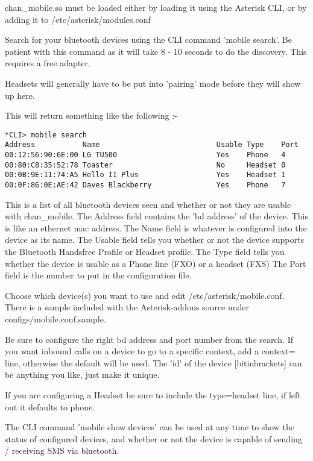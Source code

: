 chan\_mobile.so must be loaded either by loading it using the Asterisk CLI, or by adding it to /etc/asterisk/modules.conf

Search for your bluetooth devices using the CLI command 'mobile search'. Be patient with this command as
it will take 8 - 10 seconds to do the discovery. This requires a free adapter.

Headsets will generally have to be put into 'pairing' mode before they will show up here.

This will return something like the following :-

\begin{verbatim}
*CLI> mobile search
Address           Name                           Usable Type    Port
00:12:56:90:6E:00 LG TU500                       Yes    Phone   4
00:80:C8:35:52:78 Toaster                        No     Headset 0
00:0B:9E:11:74:A5 Hello II Plus                  Yes    Headset 1
00:0F:86:0E:AE:42 Daves Blackberry               Yes    Phone   7
\end{verbatim}

This is a list of all bluetooth devices seen and whether or not they are usable with chan\_mobile.
The Address field contains the 'bd address' of the device. This is like an ethernet mac address.
The Name field is whatever is configured into the device as its name.
The Usable field tells you whether or not the device supports the Bluetooth Handsfree Profile or Headset profile.
The Type field tells you whether the device is usable as a Phone line (FXO) or a headset (FXS)
The Port field is the number to put in the configuration file.

Choose which device(s) you want to use and edit /etc/asterisk/mobile.conf. There is a sample included
with the Asterisk-addons source under configs/mobile.conf.sample.

Be sure to configure the right bd address and port number from the search. If you want inbound
calls on a device to go to a specific context, add a context= line, otherwise the default will
be used. The 'id' of the device [bitinbrackets] can be anything you like, just make it unique.

If you are configuring a Headset be sure to include the type=headset line, if left out it defaults
to phone.

The CLI command 'mobile show devices' can be used at any time to show the status of configured devices,
and whether or not the device is capable of sending / receiving SMS via bluetooth.

